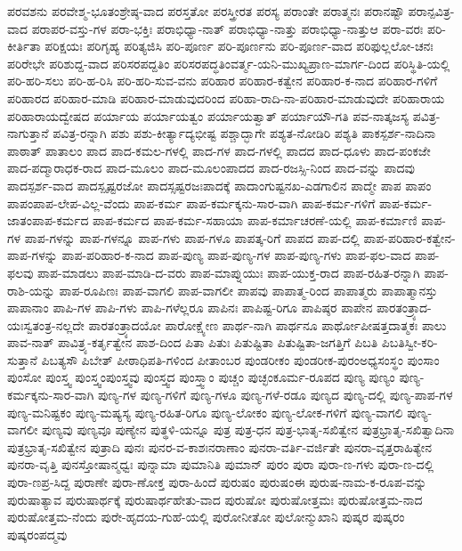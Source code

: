 {ಪರವಶನು
ಪರವೇಶ್ಮ-ಭೂತಂಶ್ರೇಷ್ಠ-ವಾದ
ಪರಸ್ತತೋ
ಪರಸ್ತ್ರೀರತ
ಪರಸ್ಯ
ಪರಾಂತೇ
ಪರಾತ್ಮನಃ
ಪರಾನಷ್ಟೌ
ಪರಾನ್ಪವಿತ್ರ-ವಾದ
ಪರಾಪರ-ವಸ್ತು-ಗಳ
ಪರಾ-ಭಕ್ತಿಃ
ಪರಾಭಿಧ್ಯಾ-ನಾತ್
ಪರಾಭಿಧ್ಯಾ-ನಾತ್ತು
ಪರಾಭಿಧ್ಯಾ-ನಾತ್ತುಆ
ಪರಾ-ವರಃ
ಪರಿ-ಕೀರ್ತಿತಾ
ಪರಿಕ್ಷಯಃ
ಪರಿಗೃಹ್ಯ
ಪರಿತ್ಯಜಿಸಿ
ಪರಿ-ಪೂರ್ಣ
ಪರಿ-ಪೂರ್ಣನು
ಪರಿ-ಪೂರ್ಣ-ವಾದ
ಪರಿಫುಲ್ಲಲೋ-ಚನಃ
ಪರಿರೇಭೇ
ಪರಿಶುದ್ದ-ವಾದ
ಪರಿಸರಪದ್ದತಿಂ
ಪರಿಸರಪದ್ಧತಿಂವರ್ತ್ಮ-ಯನಿ-ಮುಖ್ಯಪ್ರಾಣ-ಮಾರ್ಗ-ದಿಂದ
ಪರಿಸ್ಥಿತಿ-ಯಲ್ಲಿ
ಪರಿ-ಹರಿ-ಸಲು
ಪರಿ-ಹ-ರಿಸಿ
ಪರಿ-ಹರಿ-ಸುವ-ವನು
ಪರಿಹಾರ
ಪರಿಹಾರ-ಕತ್ವೇನ
ಪರಿಹಾರ-ಕ-ನಾದ
ಪರಿಹಾರ-ಗಳಿಗೆ
ಪರಿಹಾರದ
ಪರಿಹಾರ-ಮಾಡಿ
ಪರಿಹಾರ-ಮಾಡುವುದರಿಂದ
ಪರಿಹಾ-ರಾದಿ-ನಾ-ಪರಿಹಾರ-ಮಾಡುವುದೇ
ಪರಿಹಾರಾಯ
ಪರಿಹಾರಾಯದ್ವೇಷದ
ಪರ್ಯಾಯ
ಪರ್ಯಾಯತ್ವಂ
ಪರ್ಯಾಯತ್ವಾತ್
ಪರ್ಯಾಯೌ-ಗತಿ
ಪವ-ನಾತ್ಕಜಸ್ಯ
ಪವಿತ್ರ-ನಾಗುತ್ತಾನೆ
ಪವಿತ್ರ-ರನ್ನಾಗಿ
ಪಶು
ಪಶು-ಕೀರ್ತ್ಯಾದ್ಯಭೀಷ್ಟ
ಪಶ್ಚಾದ್ಭಾಗೇ
ಪಶ್ಯತ-ನೋಡಿರಿ
ಪಶ್ಯತಿ
ಪಾಕಸ್ಪರ್ಶ-ನಾದಿನಾ
ಪಾಠಾತ್
ಪಾತಾಲಂ
ಪಾದ
ಪಾದ-ಕಮಲ-ಗಳಲ್ಲಿ
ಪಾದ-ಗಳ
ಪಾದ-ಗಳಲ್ಲಿ
ಪಾದದ
ಪಾದ-ಧೂಳು
ಪಾದ-ಪಂಕಜೇ
ಪಾದ-ಪದ್ಮಾರಾಧಕ-ರಾದ
ಪಾದ-ಮೂಲಂ
ಪಾದ-ಮೂಲಂಪಾದದ
ಪಾದ-ರಜಸ್ಸಿ-ನಿಂದ
ಪಾದ-ವನ್ನು
ಪಾದವು
ಪಾದಸ್ಪರ್ಶ-ವಾದ
ಪಾದಸ್ಪೃಷ್ಟರಜೋ
ಪಾದಸ್ಸಷ್ಟರಜಃಪಾದಕ್ಕೆ
ಪಾದಾಂಗುಷ್ಟನಖ-ಎಡಗಾಲಿನ
ಪಾದ್ಮೇ
ಪಾಪ
ಪಾಪಂ
ಪಾಪಂಪಾಪ-ಲೇಪ-ವಿಲ್ಲ-ವೆಂದು
ಪಾಪ-ಕರ್ಮ
ಪಾಪ-ಕರ್ಮಕ್ಕನು-ಸಾರ-ವಾಗಿ
ಪಾಪ-ಕರ್ಮ-ಗಳಿಗೆ
ಪಾಪ-ಕರ್ಮ-ಜಾತಂಪಾಪ-ಕರ್ಮದ
ಪಾಪ-ಕರ್ಮದ
ಪಾಪ-ಕರ್ಮ-ಸಹಾಯಾ
ಪಾಪ-ಕರ್ಮಾಚರಣೆ-ಯಲ್ಲಿ
ಪಾಪ-ಕರ್ಮಾಣಿ
ಪಾಪ-ಗಳ
ಪಾಪ-ಗಳನ್ನು
ಪಾಪ-ಗಳನ್ನೂ
ಪಾಪ-ಗಳು
ಪಾಪ-ಗಳೂ
ಪಾಪತ್ಕ-ರಿಗೆ
ಪಾಪದ
ಪಾಪ-ದಲ್ಲಿ
ಪಾಪ-ಪರಿಹಾರ-ಕತ್ವೇನ-ಪಾಪ-ಗಳನ್ನು
ಪಾಪ-ಪರಿಹಾರ-ಕ-ನಾದ
ಪಾಪ-ಪುಣ್ಯ
ಪಾಪ-ಪುಣ್ಯ-ಗಳ
ಪಾಪ-ಪುಣ್ಯ-ಗಳು
ಪಾಪ-ಫಲ-ವಾದ
ಪಾಪ-ಫಲವು
ಪಾಪ-ಮಾಡಲು
ಪಾಪ-ಮಾಡಿ-ದ-ವರು
ಪಾಪ-ಮಾಪ್ನುಯುಃ
ಪಾಪ-ಯುಕ್ತ-ರಾದ
ಪಾಪ-ರಹಿತ-ರನ್ನಾಗಿ
ಪಾಪ-ರಾಶಿ-ಯನ್ನು
ಪಾಪ-ರೂಪಿಣಃ
ಪಾಪ-ವಾಗಲಿ
ಪಾಪ-ವಾಗಲೀ
ಪಾಪವು
ಪಾಪಾತ್ಮ-ರಿಂದ
ಪಾಪಾತ್ಮರು
ಪಾಪಾತ್ಮಾನಸ್ತು
ಪಾಪಾನಾಂ
ಪಾಪಿ-ಗಳ
ಪಾಪಿ-ಗಳು
ಪಾಪಿ-ಗಳೆಲ್ಲರೂ
ಪಾಪಿನಃ
ಪಾಪಿಷ್ಟ-ರಿಗೂ
ಪಾಪಿಷ್ಠರ
ಪಾಪೇನ
ಪಾರತಂತ್ರ್ಯಾದ-ಯಃಸ್ವತಂತ್ರ-ನಲ್ಲದೇ
ಪಾರತಂತ್ರ್ಯಾದಯೋ
ಪಾರೋಕ್ಷ್ಯೇಣ
ಪಾರ್ಥ-ನಾಗಿ
ಪಾರ್ಥನೂ
ಪಾರ್ಥೋಪೀಷತ್ತದಾತ್ಮಕಃ
ಪಾಲು
ಪಾವ-ನಾತ್
ಪಾವಿತ್ರ್ಯ-ಕರ್ತೃತ್ವೇನ
ಪಾಶ-ದಿಂದ
ಪಿತಾ
ಪಿತುಃ
ಪಿತುಷ್ಟಿತಾ
ಪಿತುಷ್ಟಿತಾ-ಜಗತ್ತಿಗೆ
ಪಿಬತಿ
ಪಿಬತಿಸ್ವೀ-ಕರಿ-ಸುತ್ತಾನೆ
ಪಿಬತ್ಯಸೌ
ಪಿಬೇತ್
ಪೀಠಾಧಿಪತಿ-ಗಳಿಂದ
ಪೀತಾಂಬರ
ಪುಂಡರೀಕಂ
ಪುಂಡರೀಕ-ಪುರಂಅಧ್ಯಸಂಸ್ಥಂ
ಪುಂಸಾಂ
ಪುಂಸೋ
ಪುಂಸ್ತ್ವ
ಪುಂಸ್ತ್ವಂಪುಂಸ್ತ್ವವು
ಪುಂಸ್ತ್ವದ
ಪುಂಸ್ತ್ವಾಂ
ಪುಚ್ಚಂ
ಪುಚ್ಛಂಕೂರ್ಮ-ರೂಪದ
ಪುಣ್ಯ
ಪುಣ್ಯಂ
ಪುಣ್ಯ-ಕರ್ಮಕ್ಕನು-ಸಾರ-ವಾಗಿ
ಪುಣ್ಯ-ಗಳ
ಪುಣ್ಯ-ಗಳಿಗೆ
ಪುಣ್ಯ-ಗಳೂ
ಪುಣ್ಯ-ಗಳೆ-ರಡೂ
ಪುಣ್ಯದ
ಪುಣ್ಯ-ದಲ್ಲಿ
ಪುಣ್ಯ-ಪಾಪ-ಗಳ
ಪುಣ್ಯ-ಮನಿಷ್ಟಕಂ
ಪುಣ್ಯ-ಮಷ್ಯಸ್ಯ
ಪುಣ್ಯ-ರಹಿತ-ರಿಗೂ
ಪುಣ್ಯ-ಲೋಕಂ
ಪುಣ್ಯ-ಲೋಕ-ಗಳಿಗೆ
ಪುಣ್ಯ-ವಾಗಲಿ
ಪುಣ್ಯ-ವಾಗಲೀ
ಪುಣ್ಯವು
ಪುಣ್ಯವೂ
ಪುಣ್ಯೇನ
ಪುತ್ಥಳಿ-ಯನ್ನೂ
ಪುತ್ರ
ಪುತ್ರ-ಧನ
ಪುತ್ರ-ಭಾತೃ-ಸಖಿತ್ವೇನ
ಪುತ್ರಭ್ರಾತೃ-ಸಖಿತ್ವಾದಿನಾ
ಪುತ್ರಭ್ರಾತೃ-ಸಖಿತ್ವೇನ
ಪುತ್ರಾದಿ
ಪುನಃ
ಪುನರ-ವ-ಕಾಶಃನರಾಣಾಂ
ಪುನರಾ-ವರ್ತಿ-ವರ್ಜಿತೇ
ಪುನರಾ-ವೃತ್ತರಾಹಿತ್ಯೇನ
ಪುನರಾ-ವೃತ್ತಿ
ಪುನಸ್ತೋಷಾನ್ಮಧ್ವಃ
ಪುನ್ನಾಮಾ
ಪುಮಾನಿತಿ
ಪುಮಾನ್
ಪುರಂ
ಪುರಾ
ಪುರಾ-ಣ-ಗಳು
ಪುರಾ-ಣ-ದಲ್ಲಿ
ಪುರಾ-ಣಪ್ರ-ಸಿದ್ದ
ಪುರಾಣೇ
ಪುರಾ-ಣೋಕ್ತ
ಪುರಾ-ಹಿಂದೆ
ಪುರುಷಂ
ಪುರುಷಂಈ
ಪುರುಷ-ನಾಮ-ಕ-ರೂಪ-ವನ್ನು
ಪುರುಷಾತ್ಯಾವ
ಪುರುಷಾರ್ಥಕ್ಕೆ
ಪುರುಷಾರ್ಥಹೇತು-ವಾದ
ಪುರುಷೋ
ಪುರುಷೋತ್ತಮಃ
ಪುರುಷೋತ್ತಮ-ನಾದ
ಪುರುಷೋತ್ತಮ-ನೆಂದು
ಪುರೇ-ಹೃದಯ-ಗುಹೆ-ಯಲ್ಲಿ
ಪುರೋನೀತೋ
ಪುಲೋನ್ಮುಖಾನಿ
ಪುಷ್ಕರ
ಪುಷ್ಕರಂ
ಪುಷ್ಕರಂಪದ್ಮವು
}

